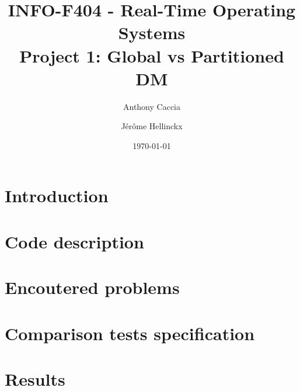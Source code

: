 \documentclass{scrartcl}
\title{INFO-F404 - Real-Time Operating Systems\\Project 1: Global vs Partitioned DM}
\author{Anthony Caccia \and J\'{e}r\^{o}me Hellinckx}
\date{\today}
\begin{document}
\maketitle

\section{Introduction}

\section{Code description}

\section{Encoutered problems}

\section{Comparison tests specification}

\section{Results}
\end{document}

